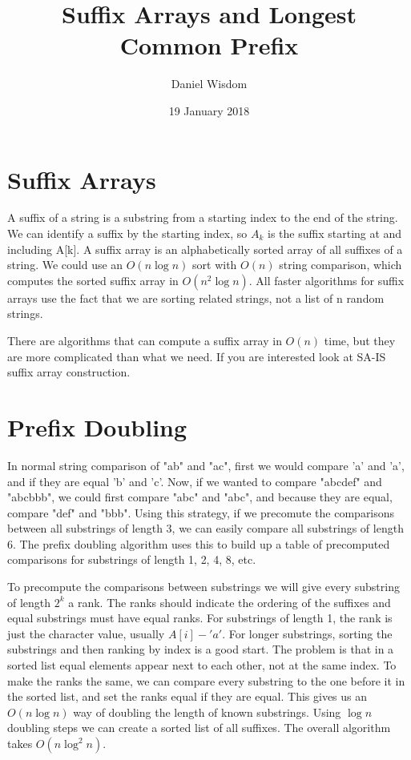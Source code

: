 \documentclass[11pt]{article}
\title{Suffix Arrays and Longest Common Prefix}
\author{Daniel Wisdom}
\date{19 January 2018}
\begin{document}
\maketitle

\section{Suffix Arrays}

A suffix of a string is a substring from a starting index to the end of the string.  We can identify a suffix by the starting index, so $A_k$ is the suffix starting at and including A[k]. A suffix array is an alphabetically sorted array of all suffixes of a string.  We could use an $O(n \log n)$ sort with $O(n)$ string comparison, which computes the sorted suffix array in $O(n^2 \log n)$.  All faster algorithms for suffix arrays use the fact that we are sorting related strings, not a list of n random strings.

There are algorithms that can compute a suffix array in $O(n)$ time, but they are more complicated than what we need.  If you are interested look at SA-IS suffix array construction.

\section{Prefix Doubling}

In normal string comparison of "ab" and "ac", first we would compare 'a' and 'a', and if they are equal 'b' and 'c'.  Now, if we wanted to compare "abcdef" and "abcbbb", we could first compare "abc" and "abc", and because they are equal, compare "def" and "bbb".  Using this strategy, if we precomute the comparisons between all substrings of length 3, we can easily compare all substrings of length 6.  The prefix doubling algorithm uses this to build up a table of precomputed comparisons for substrings of length 1, 2, 4, 8, etc.

To precompute the comparisons between substrings we will give every substring of length $2^k$ a rank. The ranks should indicate the ordering of the suffixes and equal substrings must have equal ranks.  For substrings of length 1, the rank is just the character value, usually $A[i]-'a'$.  For longer substrings, sorting the substrings and then ranking by index is a good start.  The problem is that in a sorted list equal elements appear next to each other, not at the same index.  To make the ranks the same, we can compare every substring to the one before it in the sorted list, and set the ranks equal if they are equal.  This gives us an $O(n\log n)$ way of doubling the length of known substrings.  Using $\log n$ doubling steps we can create a sorted list of all suffixes.  The overall algorithm takes $O(n \log^2 n)$.
\end{document}
